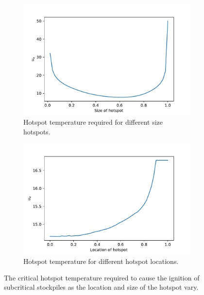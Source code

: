 \begin{figure}[h!]
\centering
\begin{subfigure}{.5\textwidth}
  \centering
  \includegraphics[width=\linewidth]{figures/NDA/Hotspot/size_inert1.pdf}  
  \caption{Hotspot temperature required for different size hotspots.}
  \label{fig:hot:size_i}
\end{subfigure}%
\begin{subfigure}{.5\textwidth}
  \centering
  \includegraphics[width=\linewidth]{figures/NDA/Hotspot/Location_inert1.pdf}
  \caption{Hotspot temperature for different hotspot locations.}
  \label{fig:hot:loc_i}
\end{subfigure}
\label{fig:hot:size_loc_inert}
\caption{The critical hotspot temperature required to cause the ignition of subcritical stockpiles as the location and size of the hotspot vary.}
\end{figure}

